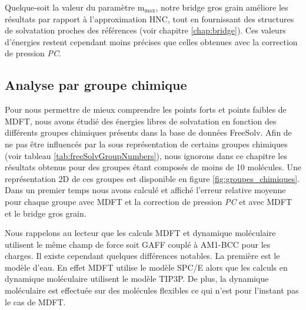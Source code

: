 Quelque-soit la valeur du paramètre $\mathrm{m}_\mathrm{max}$, notre bridge gros grain améliore les résultats par rapport à l'approximation HNC, tout en fournissant des structures de solvatation proches des références (voir chapitre \ref{chap:bridge}). Ces valeurs d'énergies restent cependant moins précises que celles obtenues avec la correction de pression \textit{PC}.





\subsection{Analyse par groupe chimique}
Pour nous permettre de mieux comprendre les points forts et points faibles de MDFT, nous avons étudié des énergies libres de solvatation en fonction des différents groupes chimiques présents dans la base de données FreeSolv. Afin de ne pas être influencés par la sous représentation de certains groupes chimiques (voir tableau \ref{tab:freeSolvGroupNumbers}), nous ignorons dans ce chapitre les résultats obtenus pour des groupes étant composés de moins de 10 molécules. Une représentation 2D de ces groupes est disponible en figure \ref{fig:groupes_chimiques}. Dans un premier temps nous avons calculé et affiché l'erreur relative moyenne pour chaque groupe avec MDFT et la correction de pression \textit{PC} et avec MDFT et le bridge gros grain.

Nous rappelons au lecteur que les calculs MDFT et dynamique moléculaire utilisent le même champ de force soit GAFF couplé à AM1-BCC pour les charges. Il existe cependant quelques différences notables. La première est le modèle d'eau. En effet MDFT utilise le modèle SPC/E alors que les calculs en dynamique moléculaire utilisent le modèle TIP3P. De plus, la dynamique moléculaire est effectuée sur des molécules flexibles ce qui n'est pour l'instant pas le cas de MDFT. 

